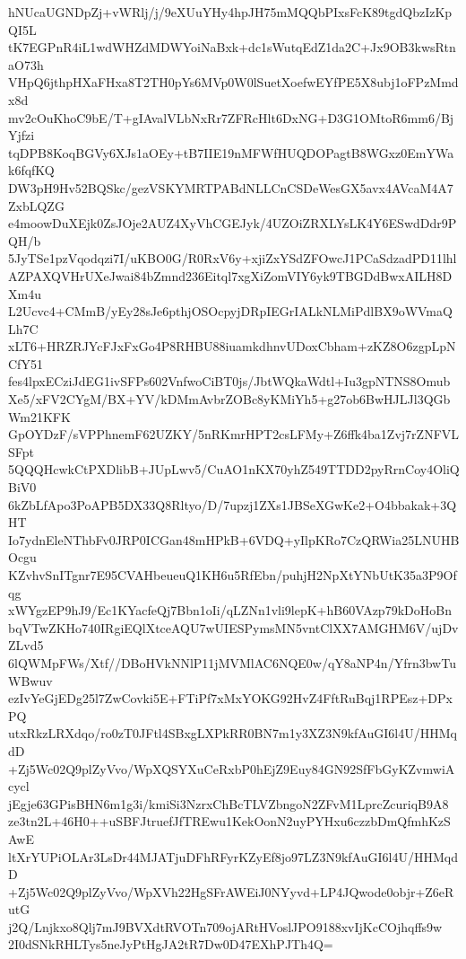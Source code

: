 hNUcaUGNDpZj+vWRlj/j/9eXUuYHy4hpJH75mMQQbPIxsFcK89tgdQbzIzKpQI5L
tK7EGPnR4iL1wdWHZdMDWYoiNaBxk+dc1sWutqEdZ1da2C+Jx9OB3kwsRtnaO73h
VHpQ6jthpHXaFHxa8T2TH0pYs6MVp0W0lSuetXoefwEYfPE5X8ubj1oFPzMmdx8d
mv2cOuKhoC9bE/T+gIAvalVLbNxRr7ZFRcHlt6DxNG+D3G1OMtoR6mm6/BjYjfzi
tqDPB8KoqBGVy6XJs1aOEy+tB7IIE19nMFWfHUQDOPagtB8WGxz0EmYWak6fqfKQ
DW3pH9Hv52BQSkc/gezVSKYMRTPABdNLLCnCSDeWesGX5avx4AVcaM4A7ZxbLQZG
e4moowDuXEjk0ZsJOje2AUZ4XyVhCGEJyk/4UZOiZRXLYsLK4Y6ESwdDdr9PQH/b
5JyTSe1pzVqodqzi7I/uKBO0G/R0RxV6y+xjiZxYSdZFOwcJ1PCaSdzadPD11lhl
AZPAXQVHrUXeJwai84bZmnd236Eitql7xgXiZomVIY6yk9TBGDdBwxAILH8DXm4u
L2Ucvc4+CMmB/yEy28sJe6pthjOSOcpyjDRpIEGrIALkNLMiPdlBX9oWVmaQLh7C
xLT6+HRZRJYcFJxFxGo4P8RHBU88iuamkdhnvUDoxCbham+zKZ8O6zgpLpNCfY51
fes4lpxECziJdEG1ivSFPs602VnfwoCiBT0js/JbtWQkaWdtl+Iu3gpNTNS8Omub
Xe5/xFV2CYgM/BX+YV/kDMmAvbrZOBc8yKMiYh5+g27ob6BwHJLJl3QGbWm21KFK
GpOYDzF/sVPPhnemF62UZKY/5nRKmrHPT2csLFMy+Z6ffk4ba1Zvj7rZNFVLSFpt
5QQQHcwkCtPXDlibB+JUpLwv5/CuAO1nKX70yhZ549TTDD2pyRrnCoy4OliQBiV0
6kZbLfApo3PoAPB5DX33Q8Rltyo/D/7upzj1ZXs1JBSeXGwKe2+O4bbakak+3QHT
Io7ydnEleNThbFv0JRP0ICGan48mHPkB+6VDQ+yIlpKRo7CzQRWia25LNUHBOcgu
KZvhvSnITgnr7E95CVAHbeueuQ1KH6u5RfEbn/puhjH2NpXtYNbUtK35a3P9Ofqg
xWYgzEP9hJ9/Ec1KYacfeQj7Bbn1oIi/qLZNn1vli9lepK+hB60VAzp79kDoHoBn
bqVTwZKHo740IRgiEQlXtceAQU7wUIESPymsMN5vntClXX7AMGHM6V/ujDvZLvd5
6lQWMpFWs/Xtf//DBoHVkNNlP11jMVMlAC6NQE0w/qY8aNP4n/Yfrn3bwTuWBwuv
ezIvYeGjEDg25l7ZwCovki5E+FTiPf7xMxYOKG92HvZ4FftRuBqj1RPEsz+DPxPQ
utxRkzLRXdqo/ro0zT0JFtl4SBxgLXPkRR0BN7m1y3XZ3N9kfAuGI6l4U/HHMqdD
+Zj5Wc02Q9plZyVvo/WpXQSYXuCeRxbP0hEjZ9Euy84GN92SfFbGyKZvmwiAcycl
jEgje63GPisBHN6m1g3i/kmiSi3NzrxChBcTLVZbngoN2ZFvM1LprcZcuriqB9A8
ze3tn2L+46H0++uSBFJtruefJfTREwu1KekOonN2uyPYHxu6czzbDmQfmhKzSAwE
ltXrYUPiOLAr3LsDr44MJATjuDFhRFyrKZyEf8jo97LZ3N9kfAuGI6l4U/HHMqdD
+Zj5Wc02Q9plZyVvo/WpXVh22HgSFrAWEiJ0NYyvd+LP4JQwode0objr+Z6eRutG
j2Q/Lnjkxo8Qlj7mJ9BVXdtRVOTn709ojARtHVoslJPO9188xvIjKcCOjhqffs9w
2I0dSNkRHLTys5neJyPtHgJA2tR7Dw0D47EXhPJTh4Q=
